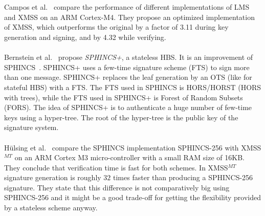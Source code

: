 \\  \\
Campos et al.~\cite{fabio_paper_lms_vs_xmss} compare the performance of different implementations of LMS and XMSS on an ARM Cortex-M4. They propose an optimized implementation of XMSS, which outperforms the original by a factor of 3.11 during key generation and signing, and by 4.32 while verifying.
\\ \\
Bernstein et al.~\cite{tweakable_basispaper_sphincs_2019} propose \textit{SPHINCS+}, a stateless HBS. It is an improvement of SPHINCS~\cite{sphincs_old_version_2015}.
SPHINCS+ uses a few-time signature scheme (FTS) to sign more than one message.
SPHINCS+ replaces the leaf generation by an OTS (like for stateful HBS) with a FTS.
The FTS used in SPHINCS is HORS/HORST (HORS with trees), while the FTS used in SPHINCS+ is Forest of Random Subsets (FORS). The idea of SPHINCS+ is to authenticate a huge number of few-time keys using a hyper-tree. The root of the hyper-tree is the public key of the signature system.
~\cite{tweakable_basispaper_sphincs_2019,sphincs+_submission_nist_round2}
\\ \\
Hülsing et al.~\cite{armed_sphincs_2015} compare the SPHINCS implementation SPHINCS-256 with XMSS$^{MT}$ on an ARM Cortex M3 micro-controller with a small RAM size of 16KB. They conclude that verification time is fast for both schemes. In XMSS$^{MT}$ signature generation is roughly $32$ times faster than producing a SPHINCS-256 signature. They state that this difference is not comparatively big using SPHINCS-256 and it might be a good trade-off for getting the flexibility provided by a stateless scheme anyway.



